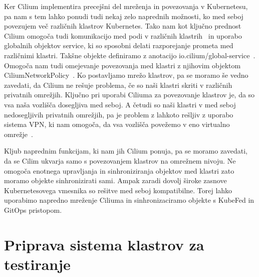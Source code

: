 \documentclass[a4paper, 12pt]{book}
\begin{document}
Ker Cilium implementira precejšni del mreženja in povezovanja v Kubernetesu, pa nam s tem lahko ponudi tudi nekaj zelo naprednih možnosti, ko med seboj povezujem več različnih klastrov Kubernetes.
Tako nam kot ključno prednost Cilium omogoča tudi komunikacijo med podi v različnih klastrih~\cite{cilium-cluster-mesh} in uporabo globalnih objektov service, ki so sposobni delati razporejanje prometa med različnimi klastri.
Takšne objekte definiramo z anotacijo io.cilium/global-service~\cite{setup-cilium-cluster-mesh}.
Omogoča nam tudi omejevanje povezovanja med klastri z njihovim objektom CiliumNetworkPolicy~\cite{setup-cilium-cluster-mesh}.
Ko postavljamo mrežo klastrov, pa se moramo še vedno zavedati, da Cilium ne rešuje problema, če so naši klastri skriti v različnih privatnih omrežjih.
Ključno pri uporabi Ciliuma za povezovanje klastrov je, da so vsa naša vozlišča dosegljiva med seboj.
A četudi so naši klastri v med seboj nedosegljivih privatnih omrežjih, pa je problem z lahkoto rešljiv z uporabo sistema VPN, ki nam omogoča, da vsa vozlišča povežemo v eno virtualno omrežje~\cite{setup-cilium-cluster-mesh}.

Kljub naprednim funkcijam, ki nam jih Cilium ponuja, pa se moramo zavedati, da se Cilim ukvarja samo s povezovanjem klastrov na omrežnem nivoju.
Ne omogoča enotnega upravljanja in sinhroniziranja objektov med klastri zato moramo objekte sinhronizirati sami.
Ampak zaradi dovolj široke zasnove Kubernetesovega vmesnika so rešitve med seboj kompatibilne.
Torej lahko uporabimo napredno mreženje Ciliuma in sinhronizaciramo objekte s KubeFed in GitOps pristopom.
\chapter{Priprava sistema klastrov za testiranje}
\end{document}
